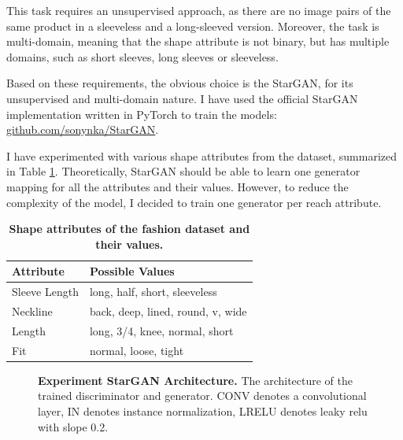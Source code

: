 \documentclass[12pt]{report}
\begin{document}
This task requires an unsupervised approach, as there are no image pairs of the same product in a sleeveless and a long-sleeved version. Moreover, the task is multi-domain, meaning that the shape attribute is not binary, but has multiple domains, such as short sleeves, long sleeves or sleeveless. 

Based on these requirements, the obvious choice is the StarGAN, for its unsupervised and multi-domain nature. I have used the official StarGAN implementation written in PyTorch to train the models: \hyperlink{https://github.com/sonynka/StarGAN}{github.com/sonynka/StarGAN}.

I have experimented with various shape attributes from the dataset, summarized in Table \ref{tab:shape_attr}. Theoretically, StarGAN should be able to learn one generator mapping for all the attributes and their values. However, to reduce the complexity of the model, I decided to train one generator per reach attribute.

\begin{table}[h]
\centering
\begin{tabular}{*{2}{l}}
Attribute & Possible Values \\
\hline
Sleeve Length			& long, half, short, sleeveless \\
Neckline  				& back, deep, lined, round, v, wide \\
Length					& long, 3/4, knee, normal, short \\
Fit			 			& normal, loose, tight \\
\end{tabular}
\caption{\label{tab:shape_attr}\textbf{Shape attributes of the fashion dataset and their values.} %
}
\end{table}


\begin{figure}[h]
\centering
{}\vspace{.5cm}
\caption{\label{fig:stargan_arch} \textbf{Experiment StarGAN Architecture.} The architecture of the trained  discriminator and generator. CONV denotes a convolutional layer, IN denotes instance normalization, LRELU denotes leaky relu with slope 0.2.}
\end{figure}
\end{document}
